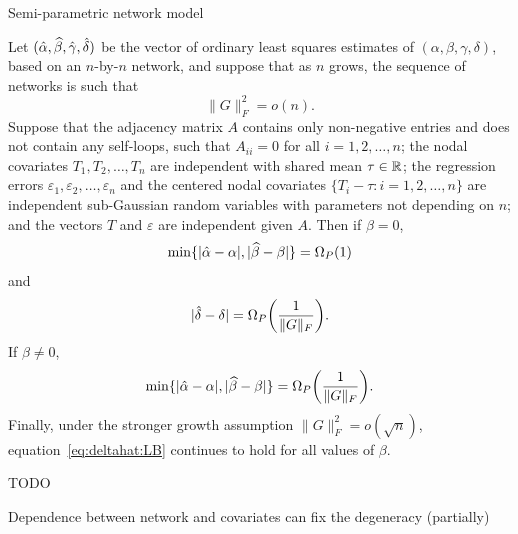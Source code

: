 \documentclass[final]{beamer}
\newlength{\colwidth}
\begin{document}
\begin{frame}[t]
\begin{columns}[t]
\begin{column}{\colwidth}
\begin{block}{Semi-parametric network model}
                \begin{theorem} \label{thm:indepcov:blowup}
                    Let $(\hat{\alpha}, \widehat{\beta}, \hat{\gamma}, \hat{\delta})$ be the vector of ordinary least squares estimates of $(\alpha, \beta, \gamma, \delta)$, based on an $n$-by-$n$ network, and suppose that as $n$ grows, the sequence of networks is such that
                    \begin{equation} \label{eq:frobG:growthbound}
                        \| G \|_F^2 = o( n ).
                    \end{equation}
                    Suppose that the adjacency matrix $A$ contains only non-negative entries and does not contain any self-loops, such that $A_{ii} = 0$ for all $i = 1, 2,\dots, n$; the nodal covariates $T_1,T_2,\dots,T_n$ are independent with shared mean $\tau \in \mathbb{R}$; the regression errors $\varepsilon_1, \varepsilon_2, \dots, \varepsilon_n$ and the centered nodal covariates $\{ T_i - \tau : i =1,2,\dots,n \}$ are independent sub-Gaussian random variables with parameters not depending on $n$; and the vectors $T$ and $\varepsilon$ are independent given $A$.
                    Then if $\beta = 0$,
                    \begin{equation*}
                        \min\{ |\alphahat-\alpha|, |\betahat-\beta| \}
                        = \Omegap{ 1 }
                    \end{equation*}
                    and
                    \begin{equation} \label{eq:deltahat:LB}
                        | \deltahat - \delta | = \Omegap{ \frac{1}{\|G\|_F} }.
                    \end{equation}
                    If $\beta \neq 0$,
                    \begin{equation*}
                        \min\{ |\alphahat-\alpha|, |\betahat-\beta| \}
                        = \Omegap{ \frac{1}{\|G\|_F} }.
                    \end{equation*}
                    Finally, under the stronger growth assumption $\|G\|_F^2 = o( \sqrt{n} )$, equation~\eqref{eq:deltahat:LB} continues to hold for all values of $\beta$.
                \end{theorem}

                TODO
            \end{block}

            \begin{block}{Dependence between network and covariates can fix the degeneracy (partially)}


\end{block}
\end{column}
\end{columns}
\end{frame}
\end{document}

